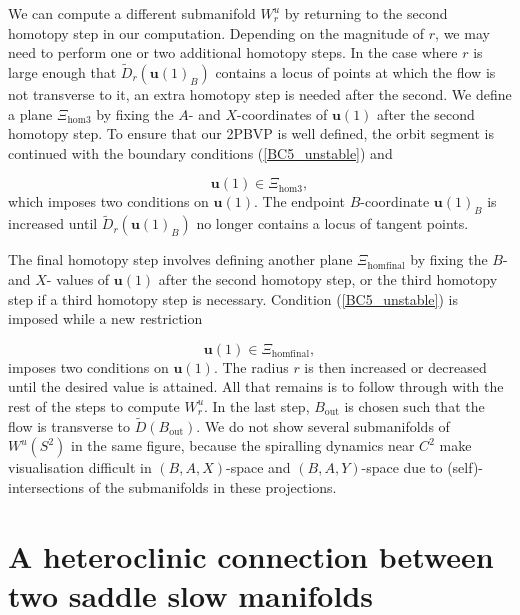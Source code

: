 \documentclass{ws-ijbc}
\begin{document}
We can compute a different submanifold $W^u_r$ by returning to the second homotopy step in our computation.   Depending on the magnitude of $r$, we may need to perform one or two additional homotopy steps.  In the case where $r$ is large enough that $\widetilde{D}_r(\mathbf{u}(1)_B)$ contains a locus of points at which the flow is not transverse to it, an extra homotopy step is needed after the second.  We define a plane $\Xi_{\mathrm{hom3}}$ by fixing the $A$- and $X$-coordinates of $\mathbf{u}(1)$ after the second homotopy step.  To ensure that our 2PBVP is well defined, the orbit segment is continued with the boundary conditions (\ref{BC5_unstable}) and

\begin{equation}
\mathbf{u}(1) \in \Xi_{\mathrm{hom3}},
\label{BC8_unstable}
\end{equation}
\noindent
which imposes two conditions on $\mathbf{u}(1)$.  The endpoint $B$-coordinate $\mathbf{u}(1)_B$ is increased until $\widetilde{D}_r(\mathbf{u}(1)_B)$ no longer contains a locus of tangent points.

The final homotopy step involves defining another plane $\Xi_{\mathrm{homfinal}}$ by fixing the $B$- and $X$- values of $\mathbf{u}(1)$ after the second homotopy step, or the third homotopy step if a third homotopy step is necessary.  Condition (\ref{BC5_unstable}) is imposed while a new restriction

\begin{equation}
\mathbf{u}(1) \in \Xi_{\mathrm{homfinal}},
\label{BC9_unstable}
\end{equation}
\noindent
imposes two conditions on $\mathbf{u}(1)$.  The radius $r$ is then increased or decreased until the desired value is attained.  All that remains is to follow through with the rest of the steps to compute $W^u_r$.  In the last step, $B_{\text{out}}$ is chosen such that the flow is transverse to $\widetilde{D}(B_{\text{out}})$.  We do not show several submanifolds of $W^u(S^2)$ in the same figure, because the spiralling dynamics near $C^2$ make visualisation difficult in $(B,A,X)$-space and $(B,A,Y)$-space due to (self)-intersections of the submanifolds in these projections.


\section{A heteroclinic connection between two saddle slow manifolds}
\end{document}
